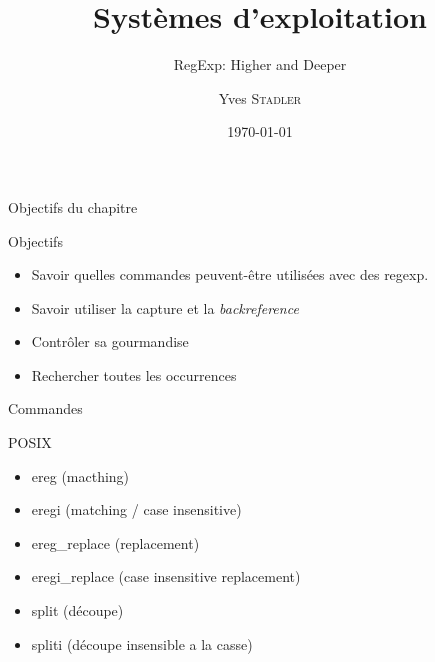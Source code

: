 
\title{Systèmes d'exploitation}
\subtitle{RegExp: Higher and Deeper}

\author{Yves \textsc{Stadler}}

\date{\today}




\begin{frame}
\titlepage
\end{frame}

\def\ftitle{Objectifs du chapitre}
\begin{frame}[containsverbatim]{\ftitle}
\def\blocktitle{Objectifs}
\begin{block}{\blocktitle}
\begin{itemize}
\item Savoir quelles commandes peuvent-être utilisées avec des regexp.
\item Savoir utiliser la capture et la \textit{backreference}
\item Contrôler sa gourmandise
\item Rechercher toutes les occurrences
\end{itemize}
\end{block}
\end{frame}


\def\ftitle{Commandes}
\begin{frame}[containsverbatim]{\ftitle}
\def\blocktitle{POSIX}
\begin{block}{\blocktitle}
\begin{itemize}
\item ereg (macthing)
\item eregi (matching / case insensitive)
\item ereg\_replace (replacement)
\item eregi\_replace (case insensitive replacement)
\item split (découpe)
\item spliti (découpe insensible a la casse)
\end{itemize}
\end{block}
\end{frame}


